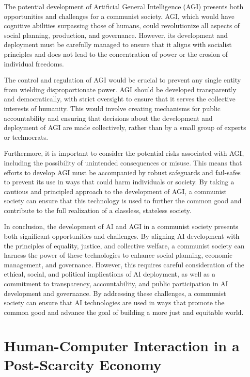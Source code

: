 The potential development of Artificial General Intelligence (AGI) presents both opportunities and challenges for a communist society. AGI, which would have cognitive abilities surpassing those of humans, could revolutionize all aspects of social planning, production, and governance. However, its development and deployment must be carefully managed to ensure that it aligns with socialist principles and does not lead to the concentration of power or the erosion of individual freedoms.

The control and regulation of AGI would be crucial to prevent any single entity from wielding disproportionate power. AGI should be developed transparently and democratically, with strict oversight to ensure that it serves the collective interests of humanity. This would involve creating mechanisms for public accountability and ensuring that decisions about the development and deployment of AGI are made collectively, rather than by a small group of experts or technocrats.

Furthermore, it is important to consider the potential risks associated with AGI, including the possibility of unintended consequences or misuse. This means that efforts to develop AGI must be accompanied by robust safeguards and fail-safes to prevent its use in ways that could harm individuals or society. By taking a cautious and principled approach to the development of AGI, a communist society can ensure that this technology is used to further the common good and contribute to the full realization of a classless, stateless society.

In conclusion, the development of AI and AGI in a communist society presents both significant opportunities and challenges. By aligning AI development with the principles of equality, justice, and collective welfare, a communist society can harness the power of these technologies to enhance social planning, economic management, and governance. However, this requires careful consideration of the ethical, social, and political implications of AI deployment, as well as a commitment to transparency, accountability, and public participation in AI development and governance. By addressing these challenges, a communist society can ensure that AI technologies are used in ways that promote the common good and advance the goal of building a more just and equitable world.

\section{Human-Computer Interaction in a Post-Scarcity Economy}

